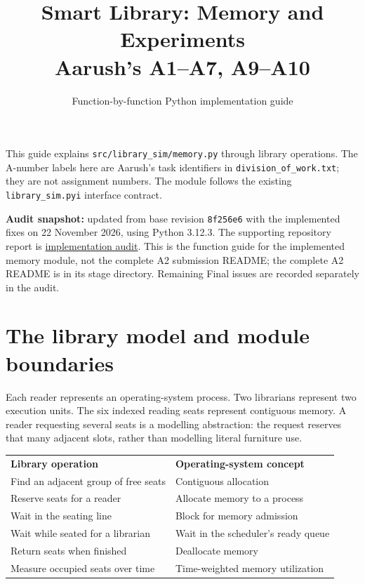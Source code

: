 \documentclass[11pt,a4paper]{article}
\title{Smart Library: Memory and Experiments\\Aarush's A1--A7, A9--A10}
\author{Function-by-function Python implementation guide}
\date{}
\begin{document}
\maketitle

This guide explains \texttt{src/library\_sim/memory.py} through library
operations. The A-number labels here are Aarush's task identifiers in
\texttt{division\_of\_work.txt}; they are not assignment numbers.
The module follows the existing \texttt{library\_sim.pyi} interface contract.

\textbf{Audit snapshot:} updated from base revision \texttt{8f256e6} with the implemented fixes on
22 November 2026, using Python 3.12.3. The supporting repository report is
\href{../implementation_audit.md}{implementation audit}.
This is the function guide for the implemented memory module, not the complete
A2 submission README; the complete A2 README is in its stage directory.
Remaining Final issues are recorded separately in the audit.

\tableofcontents
\newpage

\section{The library model and module boundaries}

Each reader represents an operating-system process. Two librarians represent
two execution units. The six indexed reading seats represent contiguous memory.
A reader requesting several seats is a modelling abstraction: the request
reserves that many adjacent slots, rather than modelling literal furniture use.

\begin{center}
\begin{tabular}{ll}
\textbf{Library operation} & \textbf{Operating-system concept} \\
Find an adjacent group of free seats & Contiguous allocation \\
Reserve seats for a reader & Allocate memory to a process \\
Wait in the seating line & Block for memory admission \\
Wait while seated for a librarian & Wait in the scheduler's ready queue \\
Return seats when finished & Deallocate memory \\
Measure occupied seats over time & Time-weighted memory utilization
\end{tabular}
\end{center}
\end{document}
